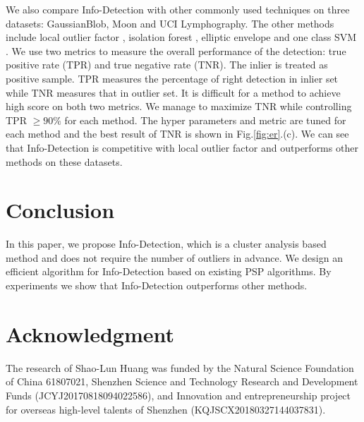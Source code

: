 \documentclass[runningheads]{llncs}
\begin{document}
We also compare Info-Detection with other commonly used techniques on three datasets: GaussianBlob, Moon and UCI Lymphography. The other methods include local outlier factor \cite{Breunig}, isolation forest \cite{if}, elliptic envelope \cite{rousseeuw1999fast} and one class SVM \cite{svm}. We use two metrics to measure the overall performance of the detection: true positive rate (TPR) and true negative rate (TNR). The inlier is treated as positive sample. TPR measures the percentage of right detection in inlier set while TNR measures that in outlier set. It is difficult for a method to achieve high score on both two metrics. We manage to maximize TNR while controlling TPR $\geq 90\%$ for each method. The hyper parameters and metric are tuned for each method and the best result of TNR is shown in Fig.\ref{fig:er}.(c). We can see that Info-Detection is competitive with local outlier factor and outperforms other methods on these datasets.

\section{Conclusion}\label{sec:Conclusion}
In this paper, we propose Info-Detection, which is a cluster analysis based method and does not require the number of outliers in advance. We design an efficient algorithm for Info-Detection based on existing PSP algorithms. By experiments we show that Info-Detection outperforms other methods.
\section*{Acknowledgment}

The research of Shao-Lun Huang was funded by the Natural Science Foundation of China 61807021, Shenzhen Science and Technology Research and Development Funds (JCYJ20170818094022586), and Innovation and entrepreneurship project for overseas high-level talents of Shenzhen (KQJSCX20180327144037831).
%
%
%


%
\end{document}
